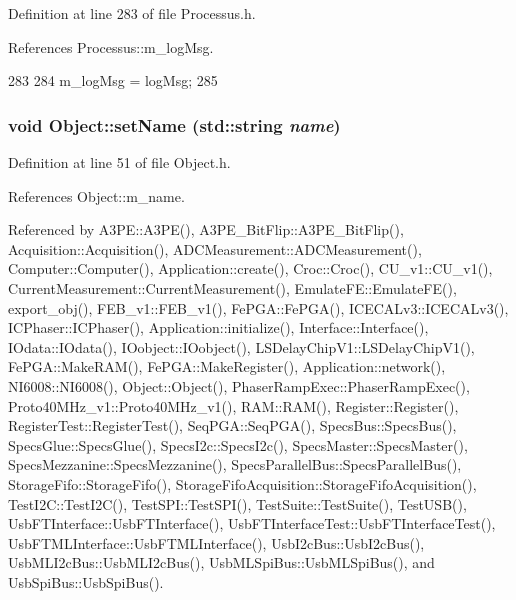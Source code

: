 Definition at line 283 of file Processus.h.

References Processus::m\_\-logMsg.


\begin{DoxyCode}
283                                     {
284     m_logMsg = logMsg;
285   }
\end{DoxyCode}
\hypertarget{classObject_ae30fea75683c2d149b6b6d17c09ecd0c}{
\subsubsection[{setName}]{\setlength{\rightskip}{0pt plus 5cm}void Object::setName (std::string {\em name})}}
\label{classObject_ae30fea75683c2d149b6b6d17c09ecd0c}


Definition at line 51 of file Object.h.

References Object::m\_\-name.

Referenced by A3PE::A3PE(), A3PE\_\-BitFlip::A3PE\_\-BitFlip(), Acquisition::Acquisition(), ADCMeasurement::ADCMeasurement(), Computer::Computer(), Application::create(), Croc::Croc(), CU\_\-v1::CU\_\-v1(), CurrentMeasurement::CurrentMeasurement(), EmulateFE::EmulateFE(), export\_\-obj(), FEB\_\-v1::FEB\_\-v1(), FePGA::FePGA(), ICECALv3::ICECALv3(), ICPhaser::ICPhaser(), Application::initialize(), Interface::Interface(), IOdata::IOdata(), IOobject::IOobject(), LSDelayChipV1::LSDelayChipV1(), FePGA::MakeRAM(), FePGA::MakeRegister(), Application::network(), NI6008::NI6008(), Object::Object(), PhaserRampExec::PhaserRampExec(), Proto40MHz\_\-v1::Proto40MHz\_\-v1(), RAM::RAM(), Register::Register(), RegisterTest::RegisterTest(), SeqPGA::SeqPGA(), SpecsBus::SpecsBus(), SpecsGlue::SpecsGlue(), SpecsI2c::SpecsI2c(), SpecsMaster::SpecsMaster(), SpecsMezzanine::SpecsMezzanine(), SpecsParallelBus::SpecsParallelBus(), StorageFifo::StorageFifo(), StorageFifoAcquisition::StorageFifoAcquisition(), TestI2C::TestI2C(), TestSPI::TestSPI(), TestSuite::TestSuite(), TestUSB(), UsbFTInterface::UsbFTInterface(), UsbFTInterfaceTest::UsbFTInterfaceTest(), UsbFTMLInterface::UsbFTMLInterface(), UsbI2cBus::UsbI2cBus(), UsbMLI2cBus::UsbMLI2cBus(), UsbMLSpiBus::UsbMLSpiBus(), and UsbSpiBus::UsbSpiBus().


